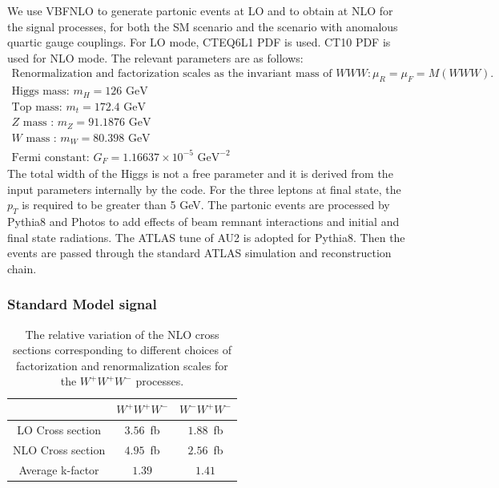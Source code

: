 We use {\sc  VBFNLO} to generate partonic events at LO and to obtain 
\xsecs at NLO for the signal processes, for both the SM scenario and
the scenario with anomalous quartic gauge couplings. For LO mode,
CTEQ6L1 PDF is used. CT10 PDF is used for NLO mode.  The relevant
parameters are as follows:
\begin{gather}
\text{Renormalization and factorization scales as the invariant mass of }WWW:  \mu_R =\mu_F = M(WWW).\\
\text{Higgs mass:  } m_H = 126 \text{ GeV} \\
\text{Top mass:  } m_t = 172.4 \text{ GeV} \\
Z \text{ mass : } m_{Z} = 91.1876 \text{ GeV} \\
W \text{ mass : } m_W = 80.398 \text{ GeV} \\
\text{Fermi constant: } G_F = 1.16637\times 10^{-5} \text{ GeV}^{-2}
\end{gather} 
The total width of the Higgs is not a free parameter and it is
derived from the input parameters internally by the code.  For the
three leptons at final state, the $p_T$ is required to be greater than
5 GeV. The partonic events are processed by {\sc
  Pythia8}\cite{Sjostrand:2007gs} and {\sc
  Photos}\cite{Golonka:2005pn} to add effects of beam remnant
interactions and initial and final state radiations. The ATLAS tune of
AU2\cite{ATLAS:2011zja} is adopted for {\sc Pythia8}.  Then the events
are passed through the standard ATLAS simulation and reconstruction
chain.
\subsubsection{Standard Model signal}

\begin{table}[ht!]
    \centering
\begin{tabular}{c|c|c}
\hline
     			  & $W^+W^+W^-$ & $W^-W^+W^-$ \\
\hline
LO Cross section  & $3.56$~fb   & $1.88$~fb \\
\hline
NLO Cross section & $4.95$~fb   & $2.56$~fb \\
\hline
Average k-factor  & $1.39$      & $1.41$ \\
\hline
\end{tabular}
\caption{The relative variation of the NLO cross sections corresponding 
to different choices of factorization and renormalization scales for 
the $W^+W^+W^-$ processes. }
\label{tab:CrossSectionsSMLONLO}
\end{table}

